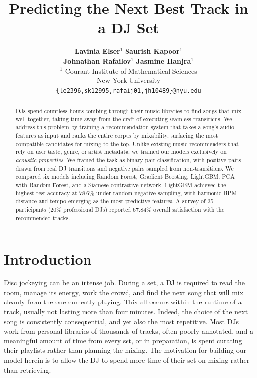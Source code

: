 \documentclass{article}
\title{Predicting the Next Best Track in a DJ Set}
\author{%
  \textbf{Lavinia Elser}$^{1}$ \quad \textbf{Saurish Kapoor}$^{1}$ \quad  \\ \textbf{Johnathan Rafailov}$^{1}$ \quad \textbf{Jasmine Hanjra}$^{1}$ \\
  $^{1}$ Courant Institute of Mathematical Sciences \\
  New York University\\
  \texttt{\{le2396,sk12995,rafaij01,jh10489\}@nyu.edu} \\
}
\begin{document}

\maketitle

\begin{abstract}
DJs spend countless hours combing through their music libraries to find songs that mix well together, taking time away from the craft of executing seamless transitions. We address this problem by training a recommendation system that takes a song's audio features as input and ranks the entire corpus by mixability, surfacing the most compatible candidates for mixing to the top. Unlike existing music recommenders that rely on user taste, genre, or artist metadata, we trained our models exclusively on \emph{acoustic properties}. We framed the task as binary pair classification, with positive pairs drawn from real DJ transitions and negative pairs sampled from non-transitions. We compared six models including Random Forest, Gradient Boosting, LightGBM, PCA with Random Forest, and a Siamese contrastive network. LightGBM achieved the highest test accuracy at $78.6\%$ under random negative sampling, with harmonic BPM distance and tempo emerging as the most predictive features. A survey of 35 participants ($20\%$ professional DJs) reported $67.84\%$ overall satisfaction with the recommended tracks.
\end{abstract}


\section{Introduction}

Disc jockeying can be an intense job. During a set, a DJ is required to read the room, manage its energy, work the crowd, and find the next song that will mix cleanly from the one currently playing. This all occurs within the runtime of a track, usually not lasting more than four minutes. Indeed, the choice of the next song is consistently consequential, and yet also the most repetitive. Most DJs work from personal libraries of thousands of tracks, often poorly annotated, and a meaningful amount of time from every set, or in preparation, is spent curating their playlists rather than planning the mixing. The motivation for building our model herein is to allow the DJ to spend more time of their set on mixing rather than retrieving. 
\end{document}
